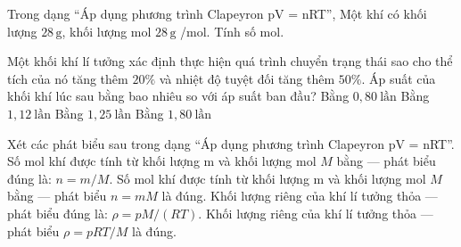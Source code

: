 \begin{ex}
Trong dạng “Áp dụng phương trình Clapeyron pV = nRT”, Một khí có khối lượng $28\,\text{g}$, khối lượng mol $28\,\text{g}$ /mol. Tính số mol.
\end{ex}

\begin{ex}
Một khối khí lí tưởng xác định thực hiện quá trình chuyển trạng thái sao cho thể tích của nó tăng thêm $20\%$ và nhiệt độ tuyệt đối tăng thêm $50\%$. Áp suất của khối khí lúc sau bằng bao nhiêu so với áp suất ban đầu?
\choice
{Bằng $0,80\ \text{lần}$}
{Bằng $1,12\ \text{lần}$}
{\True Bằng $1,25\ \text{lần}$}
{Bằng $1,80\ \text{lần}$}
\end{ex}

\begin{ex}
Xét các phát biểu sau trong dạng “Áp dụng phương trình Clapeyron pV = nRT”.
\choiceTF
{\True Số mol khí được tính từ khối lượng m và khối lượng mol $M$ bằng — phát biểu đúng là: $n=m/M$.}
{Số mol khí được tính từ khối lượng m và khối lượng mol $M$ bằng — phát biểu $n=mM$ là đúng.}
{\True Khối lượng riêng của khí lí tưởng thỏa — phát biểu đúng là: $\rho=pM/(RT)$.}
{Khối lượng riêng của khí lí tưởng thỏa — phát biểu $\rho=pRT/M$ là đúng.}
\end{ex}

